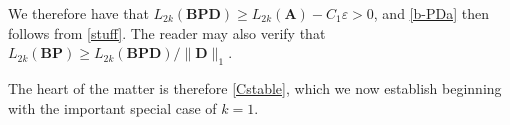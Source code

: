 \documentclass[journal, twocolumn]{IEEEtran}
\begin{document}
%
We therefore have that $L_{2k}(\mathbf{BPD}) \geq L_{2k}(\mathbf{A}) - C_1\varepsilon  > 0$, and \eqref{b-PDa} then follows from \eqref{stuff}. The reader may also verify that $L_{2k}(\mathbf{BP}) \geq L_{2k}(\mathbf{BPD}) / \|\mathbf{D}\|_1$.

The heart of the matter is therefore \eqref{Cstable}, which we now establish beginning with the important special case of $k = 1$. 
\end{document}
